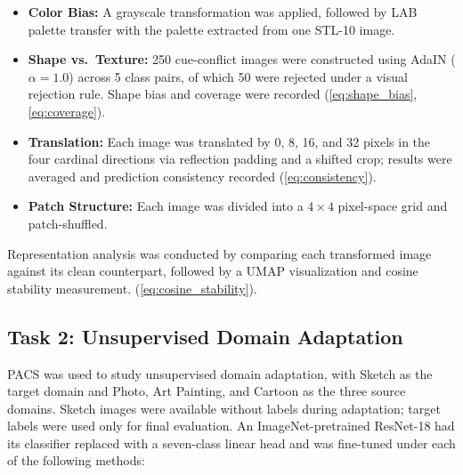 \documentclass{article}
\begin{document}
\begin{itemize}
    \item \textbf{Color Bias:} A grayscale transformation was applied, followed by LAB palette transfer with the palette extracted from one STL-10 image.
    \item \textbf{Shape vs.\ Texture:} 250 cue-conflict images were constructed using AdaIN ($\alpha = 1.0$) \citep{huang2017adain} across 5 class pairs, of which 50 were rejected under a visual rejection rule. Shape bias and coverage were recorded (\eqref{eq:shape_bias}, \eqref{eq:coverage}).
    \item \textbf{Translation:} Each image was translated by 0, 8, 16, and 32 pixels in the four cardinal directions via reflection padding and a shifted crop; results were averaged and prediction consistency recorded (\eqref{eq:consistency}).
    \item \textbf{Patch Structure:} Each image was divided into a $4 \times 4$ pixel-space grid and patch-shuffled.
\end{itemize}

Representation analysis was conducted by comparing each transformed image against its clean counterpart, followed by a UMAP visualization and cosine stability measurement. (\eqref{eq:cosine_stability}).

\subsection{Task 2: Unsupervised Domain Adaptation}
\label{subsec:methods-task2}
 
PACS was used to study unsupervised domain adaptation, with Sketch as the target domain and Photo, Art Painting, and Cartoon as the three source domains. Sketch images were available without labels during adaptation; target labels were used only for final evaluation. An ImageNet-pretrained ResNet-18 had its classifier replaced with a seven-class linear head and was fine-tuned under each of the following methods:
 
\end{document}
